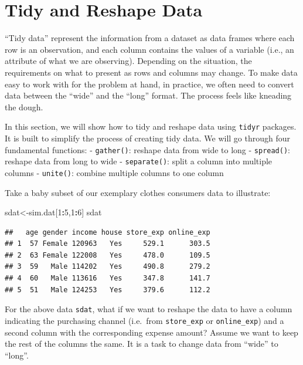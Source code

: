 \documentclass[12pt,]{krantz}
\makeatletter
\newenvironment{Shaded}{\begin{snugshade}}{\end{snugshade}}
\newcommand{\DecValTok}[1]{\textcolor[rgb]{0.06,0.06,0.06}{#1}}
\newcommand{\NormalTok}[1]{#1}
\newcommand{\OperatorTok}[1]{\textcolor[rgb]{0.43,0.43,0.43}{\textbf{#1}}}
\newenvironment{kframe}{%
\medskip{}
\setlength{\fboxsep}{.8em}
 \def\at@end@of@kframe{}%
 \ifinner\ifhmode%
  \def\at@end@of@kframe{\end{minipage}}%
  \begin{minipage}{\columnwidth}%
 \fi\fi%
 \def\FrameCommand##1{\hskip\@totalleftmargin \hskip-\fboxsep
 \colorbox{shadecolor}{##1}\hskip-\fboxsep
     \hskip-\linewidth \hskip-\@totalleftmargin \hskip\columnwidth}%
 \MakeFramed {\advance\hsize-\width
   \@totalleftmargin\z@ \linewidth\hsize
   \@setminipage}}%
 {\par\unskip\endMakeFramed%
 \at@end@of@kframe}
\renewenvironment{Shaded}{\begin{kframe}}{\end{kframe}}
\makeatother
\begin{document}
\hypertarget{tidy-and-reshape-data}{%
\section{Tidy and Reshape Data}\label{tidy-and-reshape-data}}

``Tidy data'' represent the information from a dataset as data frames where each row is an observation, and each column contains the values of a variable (i.e., an attribute of what we are observing). Depending on the situation, the requirements on what to present as rows and columns may change. To make data easy to work with for the problem at hand, in practice, we often need to convert data between the ``wide'' and the ``long'' format. The process feels like kneading the dough.

In this section, we will show how to tidy and reshape data using \texttt{tidyr} packages. It is built to simplify the process of creating tidy data. We will go through four fundamental functions:
- \texttt{gather()}: reshape data from wide to long
- \texttt{spread()}: reshape data from long to wide
- \texttt{separate()}: split a column into multiple columns
- \texttt{unite()}: combine multiple columns to one column

Take a baby subset of our exemplary clothes consumers data to illustrate:

\begin{Shaded}
\begin{Highlighting}[]
\NormalTok{sdat<-sim.dat[}\DecValTok{1}\OperatorTok{:}\DecValTok{5}\NormalTok{,}\DecValTok{1}\OperatorTok{:}\DecValTok{6}\NormalTok{]}
\NormalTok{sdat}
\end{Highlighting}
\end{Shaded}

\begin{verbatim}
##   age gender income house store_exp online_exp
## 1  57 Female 120963   Yes     529.1      303.5
## 2  63 Female 122008   Yes     478.0      109.5
## 3  59   Male 114202   Yes     490.8      279.2
## 4  60   Male 113616   Yes     347.8      141.7
## 5  51   Male 124253   Yes     379.6      112.2
\end{verbatim}

For the above data \texttt{sdat}, what if we want to reshape the data to have a column indicating the purchasing channel (i.e.~from \texttt{store\_exp} or \texttt{online\_exp}) and a second column with the corresponding expense amount? Assume we want to keep the rest of the columns the same. It is a task to change data from ``wide'' to ``long''.
\end{document}
